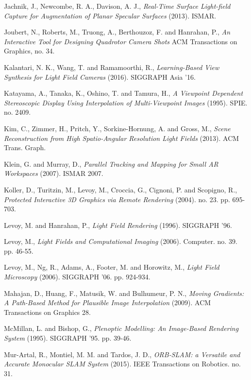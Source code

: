 \documentclass[12pt]{report}
\begin{document}
\begin{thebibliography}{10}
	Jachnik, J., Newcombe, R. A., Davison, A. J., \emph{Real-Time Surface Light-field Capture for Augmentation of Planar Specular Surfaces} (2013). ISMAR.
	
	Joubert, N., Roberts, M., Truong, A., Berthouzoz, F. and Hanrahan, P., \emph{An Interactive Tool for Designing Quadrotor Camera Shots} ACM Transactions on Graphics, no. 34. 

	Kalantari, N. K., Wang, T. and Ramamoorthi, R., \emph{Learning-Based View Synthesis for Light Field Cameras} (2016). SIGGRAPH Asia '16.

	Katayama, A., Tanaka, K., Oshino, T. and Tamura, H., \emph{A Viewpoint Dependent Stereoscopic Display Using Interpolation of Multi-Viewpoint Images} (1995). SPIE. no. 2409.
	
	Kim, C., Zimmer, H., Pritch, Y., Sorkine-Hornung, A. and Gross, M., \emph{Scene Reconstruction from High Spatio-Angular Resolution Light Fields} (2013). ACM Trans. Graph.	
	
	Klein, G. and Murray, D., \emph{Parallel Tracking and Mapping for Small AR Workspaces} (2007). ISMAR 2007. 	

	Koller, D., Turitzin, M., Levoy, M., Croccia, G., Cignoni, P. and Scopigno, R., \emph{Protected Interactive 3D Graphics via Remote Rendering} (2004). no. 23. pp. 695-703.

	Levoy, M. and Hanrahan, P., \emph{Light Field Rendering} (1996). SIGGRAPH '96.
	
	Levoy, M., \emph{Light Fields and Computational Imaging} (2006). Computer. no. 39. pp. 46-55.

	Levoy, M., Ng, R., Adams, A., Footer, M. and Horowitz, M., \emph{Light Field Microscopy} (2006). SIGGRAPH '06. pp. 924-934.
	
	Mahajan, D., Huang, F., Matusik, W. and Bulhumeur, P. N., \emph{Moving Gradients: A Path-Based Method for Plausible Image Interpolation} (2009). ACM Transactions on Graphics 28.	
	
	McMillan, L. and Bishop, G., \emph{Plenoptic Modelling: An Image-Based Rendering System} (1995). SIGGRAPH '95. pp. 39-46.

	Mur-Artal, R., Montiel, M. M. and Tardos, J. D., \emph{ORB-SLAM: a Versatile and Accurate Monocular SLAM System} (2015). IEEE Transactions on Robotics. no. 31.


\end{thebibliography}
\end{document}
